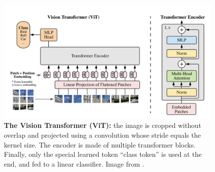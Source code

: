 \begin{figure}[tb]
      \begin{center}
            \includegraphics[width=\linewidth]{images/related/vit.png}
      \end{center}
      \caption{\textbf{The Vision Transformer (ViT):} the image is cropped without overlap and
            projected using a convolution whose stride equals the kernel size. The encoder is made of
            multiple transformer blocks. Finally, only the special learned token ``class token'' is used
            at the end, and fed to a linear classifier. Image from \cite{dosodosovitskiy2020vit}.}
      \label{fig:related_vit}
\end{figure}

